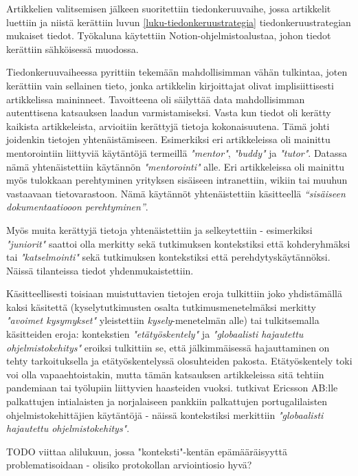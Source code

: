 \documentclass[utf8]{gradu3}
\begin{document}
Artikkelien valitsemisen jälkeen suoritettiin tiedonkeruuvaihe, jossa artikkelit luettiin ja niistä kerättiin luvun \ref{luku-tiedonkeruustrategia} tiedonkeruustrategian mukaiset tiedot. Työkaluna käytettiin Notion-ohjelmistoalustaa, johon tiedot kerättiin sähköisessä muodossa. 

Tiedonkeruuvaiheessa pyrittiin tekemään mahdollisimman vähän tulkintaa, joten kerättiin vain sellainen tieto, jonka artikkelin kirjoittajat olivat implisiittisesti artikkelissa maininneet. Tavoitteena oli säilyttää data mahdollisimman autenttisena katsauksen laadun varmistamiseksi. Vasta kun tiedot oli kerätty kaikista artikkeleista, arvioitiin kerättyjä tietoja kokonaisuutena. Tämä johti joidenkin tietojen yhtenäistämiseen. Esimerkiksi eri artikkeleissa oli mainittu mentorointiin liittyviä käytäntöjä termeillä \textit{"mentor"}, \textit{"buddy"} ja \textit{"tutor"}. Datassa nämä yhtenäistettiin käytännön \textit{"mentorointi"} alle. Eri artikkeleissa oli mainittu myös tulokkaan perehtyminen yrityksen sisäiseen intranettiin, wikiin tai muuhun vastaavaan tietovarastoon. Nämä käytännöt yhtenäistettiin käsitteellä \textit{“sisäiseen dokumentaatiooon perehtyminen”}.

Myös muita kerättyjä tietoja yhtenäistettiin ja selkeytettiin - esimerkiksi \textit{"juniorit"} saattoi olla merkitty sekä tutkimuksen kontekstiksi että kohderyhmäksi tai \textit{"katselmointi"} sekä tutkimuksen kontekstiksi että perehdytyskäytännöksi. Näissä tilanteissa tiedot yhdenmukaistettiin.

Käsitteellisesti toisiaan muistuttavien tietojen eroja tulkittiin joko yhdistämällä kaksi käsitettä (kyselytutkimusten osalta tutkimusmenetelmäksi merkitty \textit{"avoimet kysymykset"} yleistettiin \textit{kysely}-menetelmän alle) tai tulkitsemalla käsitteiden eroja: kontekstien \textit{"etätyöskentely"} ja \textit{"globaalisti hajautettu ohjelmistokehitys"} eroiksi tulkittiin se, että jälkimmäisessä hajauttaminen on tehty tarkoituksella ja etätyöskentelyssä olosuhteiden pakosta. Etätyöskentely toki voi olla vapaaehtoistakin, mutta tämän katsauksen artikkeleissa sitä tehtiin pandemiaan \textcite{rodeghero-ym-2021} tai työlupiin \textcite{hemphill-begel-2011} liittyvien haasteiden vuoksi. \textcite{britto-ym-2020} tutkivat Ericsson AB:lle palkattujen intialaisten ja \textcite{moe-ym-2020} norjalaiseen pankkiin palkattujen portugalilaisten ohjelmistokehittäjien käytäntöjä - näissä kontekstiksi merkittiin \textit{"globaalisti hajautettu ohjelmistokehitys"}.
 
TODO viittaa alilukuun, jossa "konteksti"-kentän epämääräisyyttä problematisoidaan - olisiko protokollan arviointiosio hyvä?
\end{document}
